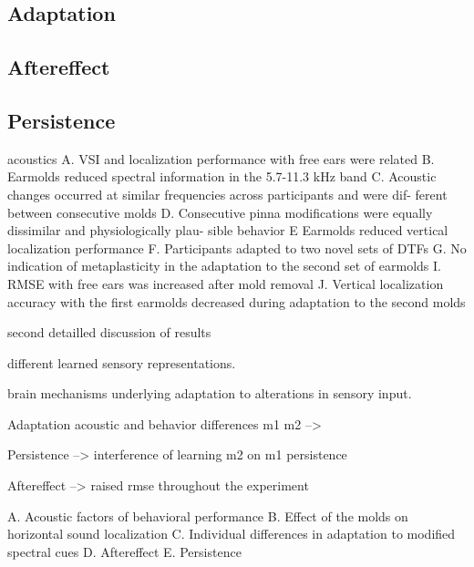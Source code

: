 \subsection{Adaptation}

\subsection{Aftereffect}

\subsection{Persistence}




acoustics
A. VSI and localization performance with free ears were related
B. Earmolds reduced spectral information in the 5.7-11.3 kHz band
C. Acoustic changes occurred at similar frequencies across participants and were dif- ferent between consecutive molds
D. Consecutive pinna modifications were equally dissimilar and physiologically plau- sible
behavior
E Earmolds reduced vertical localization performance
F. Participants adapted to two novel sets of DTFs
G. No indication of metaplasticity in the adaptation to the second set of earmolds
I. RMSE with free ears was increased after mold removal
J. Vertical localization accuracy with the first earmolds decreased during adaptation to the second molds


second detailled discussion of results

different learned sensory representations.

brain mechanisms underlying adaptation to alterations in sensory input. 


Adaptation acoustic and behavior differences m1 m2 --> 

Persistence --> interference of learning m2 on m1 persistence

Aftereffect --> raised rmse throughout the experiment



A. Acoustic factors of behavioral performance
B. Effect of the molds on horizontal sound localization
C. Individual differences in adaptation to modified spectral cues
D. Aftereffect
E. Persistence

